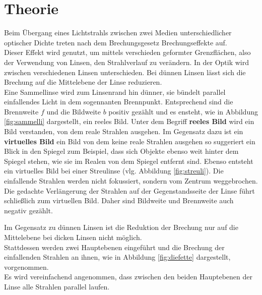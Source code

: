 \section{Theorie}
\label{sec:Theorie}
Beim Übergang eines Lichtstrahls zwischen zwei Medien unterschiedlicher optischer Dichte treten nach dem Brechungsgesetz Brechungseffekte auf.\\
Dieser Effekt wird genutzt, um mittels verschieden geformter Grenzflächen, also der Verwendung von Linsen, den Strahlverlauf zu verändern.
In der Optik wird zwischen verschiedenen Linsen unterschieden.
Bei dünnen Linsen lässt sich die Brechung auf die Mittelebene der Linse reduzieren.\\
Eine Sammellinse wird zum Linsenrand hin dünner, sie bündelt parallel einfallendes Licht in dem sogennanten Brennpunkt. Entsprechend sind die Brennweite $f$ und die Bildweite $b$ positiv gezählt und es ensteht, wie in Abbildung \ref{fig:sammelli} dargestellt, ein reeles Bild.
Unter dem Begriff \textbf{reeles Bild} wird ein Bild verstanden, von dem reale Strahlen ausgehen.
Im Gegensatz dazu ist ein \textbf{virtuelles Bild} ein Bild von dem keine reale Strahlen ausgehen so suggeriert ein Blick in den Spiegel zum Beispiel, dass sich Objekte ebenso weit hinter dem Spiegel stehen, wie sie im Realen von dem Spiegel entfernt sind.
Ebenso entsteht ein virtuelles Bild bei einer Streulinse (vlg. Abbildung \ref{fig:streuli}).
Die einfallende Strahlen werden nicht fokussiert, sondern vom Zentrum weggebrochen. Die gedachte Verlängerung der Strahlen auf der Gegenstandsseite der Linse führt schließlich zum virtuellen Bild. Daher sind Bildweite und Brennweite auch negativ gezählt.

Im Gegensatz zu dünnen Linsen ist die Reduktion der Brechung nur auf die Mittelebene bei dicken Linsen nicht möglich. \\
Stattdessen werden zwei Hauptebenen eingeführt und die Brechung der einfallenden Strahlen an ihnen, wie in Abbildung \ref{fig:diefette} dargestellt, vorgenommen.
\\Es wird vereinfachend angenommen, dass zwischen den beiden Hauptebenen der Linse alle Strahlen parallel laufen.

